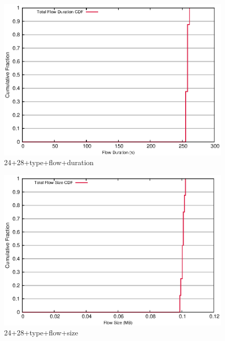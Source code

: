 \documentclass[landscape]{article}
\begin{document}
\newpage

\begin{figure}[!hbt]
\centering
\includegraphics[width=1\textwidth]{24_28_type_flow_duration.eps}
\caption{24+28+type+flow+duration}

\end{figure}

\newpage

\begin{figure}[!hbt]
\centering
\includegraphics[width=1\textwidth]{24_28_type_flow_size.eps}
\caption{24+28+type+flow+size}

\end{figure}

\newpage
\end{document}
